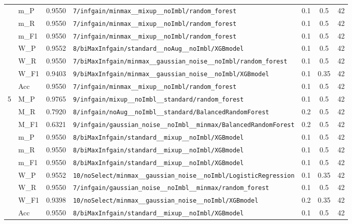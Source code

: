 \begin{table}[htbp]
\begin{tabular}{|c|l|c|>{\ttfamily\footnotesize}p{7.2cm}|c|c|c|}
 & m\_P & 0.9550 & \texttt{7/infgain/minmax\_\_mixup\_\_noImbl/random\_forest} & 0.1 & 0.5  & 42 \\ 
 & m\_R & 0.9550 & \texttt{7/infgain/minmax\_\_mixup\_\_noImbl/random\_forest} & 0.1 & 0.5  & 42 \\ 
 & m\_F1 & 0.9550 & \texttt{7/infgain/minmax\_\_mixup\_\_noImbl/random\_forest} & 0.1 & 0.5  & 42 \\ 
 & W\_P & 0.9552 & \texttt{8/biMaxInfgain/standard\_\_noAug\_\_noImbl/XGBmodel} & 0.1 & 0.5  & 42 \\ 
 & W\_R & 0.9550 & \texttt{7/biMaxInfgain/minmax\_\_gaussian\_noise\_\_noImbl/random\_forest} & 0.1 & 0.5  & 42 \\ 
 & W\_F1 & 0.9403 & \texttt{9/biMaxInfgain/minmax\_\_gaussian\_noise\_\_noImbl/XGBmodel} & 0.1 & 0.35  & 42 \\ 
 & Acc & 0.9550 & \texttt{7/infgain/minmax\_\_mixup\_\_noImbl/random\_forest} & 0.1 & 0.5  & 42 \\ 
\hline
\multirow{10}{*}{5} & M\_P & 0.9765 & \texttt{9/infgain/mixup\_\_noImbl\_\_standard/random\_forest} & 0.1 & 0.5  & 42 \\ 
 & M\_R & 0.7920 & \texttt{8/infgain/noAug\_\_noImbl\_\_standard/BalancedRandomForest} & 0.2 & 0.5  & 42 \\ 
 & M\_F1 & 0.6321 & \texttt{9/infgain/gaussian\_noise\_\_noImbl\_\_minmax/BalancedRandomForest} & 0.2 & 0.5  & 42 \\ 
 & m\_P & 0.9550 & \texttt{8/biMaxInfgain/standard\_\_mixup\_\_noImbl/XGBmodel} & 0.1 & 0.5  & 42 \\ 
 & m\_R & 0.9550 & \texttt{8/biMaxInfgain/standard\_\_mixup\_\_noImbl/XGBmodel} & 0.1 & 0.5  & 42 \\ 
 & m\_F1 & 0.9550 & \texttt{8/biMaxInfgain/standard\_\_mixup\_\_noImbl/XGBmodel} & 0.1 & 0.5  & 42 \\ 
 & W\_P & 0.9552 & \texttt{10/noSelect/minmax\_\_gaussian\_noise\_\_noImbl/LogisticRegression} & 0.1 & 0.35  & 42 \\ 
 & W\_R & 0.9550 & \texttt{7/infgain/gaussian\_noise\_\_noImbl\_\_minmax/random\_forest} & 0.1 & 0.5  & 42 \\ 
 & W\_F1 & 0.9398 & \texttt{10/noSelect/minmax\_\_gaussian\_noise\_\_noImbl/XGBmodel} & 0.2 & 0.35  & 42 \\ 
 & Acc & 0.9550 & \texttt{8/biMaxInfgain/standard\_\_mixup\_\_noImbl/XGBmodel} & 0.1 & 0.5  & 42 \\ 
\hline
\end{tabular}
\end{table}